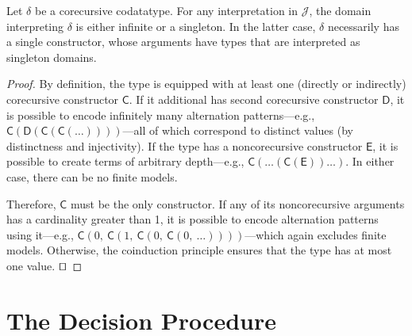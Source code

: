 \documentclass[smallcondensed,draft]{svjour3}
\newcommand\afterDot{\;} %
\newcommand\const[1]{\textsf{#1}}
\newcommand\xqed{{\hfill$\scriptstyle\squareforqed$}}
\newcommand{\JJJJ}{\mathcal{\!J\!}}
\begin{document}

\begin{lemma}%
\label{lem:corecursive-singletons}%
\afterDot
Let $\delta$ be a corecursive codatatype. For any interpretation in $\JJJJ$,
the domain interpreting $\delta$ is either infinite or a singleton. In the
latter case, $\delta$ necessarily has a single constructor, whose arguments have
types that are interpreted as singleton domains.
\end{lemma}

\begin{proof}
By definition, the type is equipped with at least one (directly or indirectly)
corecursive constructor $\const{C}$. If it additional has second
corecursive constructor $\const{D}$, it is possible to encode infinitely many
alternation patterns---e.g.,
$\const{C}(\const{D}(\const{C}(\const{C}(\ldots))))$---all of which correspond
to distinct values (by distinctness and injectivity). If the type has a
noncorecursive constructor $\const{E}$, it is possible to create terms of
arbitrary depth---e.g., $\const{C}(\ldots(\const{C}(\const{E}))\ldots)$. In
either case, there can be no finite models.

Therefore, $\const{C}$ must be the only constructor.
If any of its noncorecursive arguments has a cardinality greater than 1,
it is possible to encode alternation patterns using it---e.g.,
$\const{C}(0,\: \const{C}(1,\: \const{C}(0,\: \const{C}(0,\: \ldots))))$---which
again excludes finite models. Otherwise, the coinduction principle ensures
that the type has at most one value.
\xqed
\end{proof}


\section{The Decision Procedure} %
\label{sec:the-decision-procedure}
\end{document}

